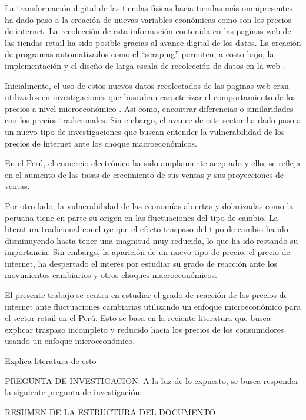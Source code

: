 \documentclass[12pt,a4paper,pdflatex]{article}
\begin{document}
La transformaci\'on digital de las tiendas f\'isicas hacia tiendas m\'as omnipresentes ha dado paso a la creaci\'on de nuevas variables econ\'omicas como son los precios de internet. La recolecci\'on de esta informaci\'on contenida en las paginas web de las tiendas retail ha sido posible gracias al avance digital de los datos. La creaci\'on de programas automatizados como el "`scraping"' permiten, a costo bajo, la implementaci\'on y el dise\~no de larga escala de recolecci\'on de datos en la web \citep{cavallo2016billion}.

Inicialmente, el uso de estos nuevos datos recolectados de las paginas web eran utilizados en investigaciones que buscaban caracterizar el comportamiento de los precios a nivel microecon\'omico \citep{cavallo2018scraped}. Asi como, encontrar diferencias o similaridades con los precios tradicionales. Sin embargo, el avance de este sector ha dado paso a un nuevo tipo de investigaciones que buscan entender la vulnerabilidad de los precios de internet ante los choque macroecon\'omicos.

En el Per\'u, el comercio electr\'onico ha sido ampliamente aceptado y ello, se refleja en el aumento de las tasas de crecimiento de sus ventas y sus proyecciones de ventas.

Por otro lado, la vulnerabilidad de las econom\'ias abiertas y dolarizadas como la peruana tiene en parte su origen en las fluctuaciones del tipo de cambio. La literatura tradicional concluye que el efecto traspaso del tipo de cambio ha ido disminuyendo hasta tener una magnitud muy reducida, lo que ha ido restando su importancia. Sin embargo, la aparici\'on de un nuevo tipo de precio, el precio de internet, ha despertado el inter\'es por estudiar su grado de reacci\'on ante los movimientos cambiarios y otros choques macroecon\'omicos.

El presente trabajo se centra en estudiar el grado de reacci\'on de los precios de internet ante fluctuaciones cambiarias utilizando un enfoque microecon\'omico para el sector retail en el Per\'u. Esto se basa en la reciente literatura que busca explicar traspaso incompleto y reducido hacia los precios de los consumidores usando un enfoque microecon\'omico.

\textcolor[rgb]{1,0.41,0.13}{Explica literatura de esto}

\textcolor[rgb]{1,0.41,0.13}{PREGUNTA DE INVESTIGACION:
}A la luz de lo expuesto, se busca responder la siguiente pregunta de investigaci\'on: 


\textcolor[rgb]{1,0.41,0.13}{RESUMEN DE LA ESTRUCTURA DEL DOCUMENTO
} 
\newpage
\end{document}
